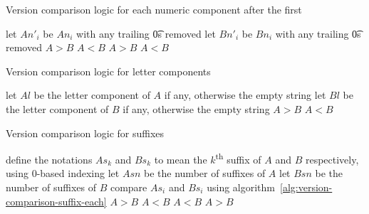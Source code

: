 \begin{algorithm}[p]
\caption{Version comparison logic for each numeric component after the first}
\label{alg:version-comparison-numeric-nonfirst}
\begin{algorithmic}[1]
    \STATE let $An'_i$ be $An_i$ with any trailing \t{0}s removed
    \STATE let $Bn'_i$ be $Bn_i$ with any trailing \t{0}s removed
      \RETURN $A>B$
      \RETURN $A<B$
    \ENDIF
  \ELSE
      \RETURN $A>B$
      \RETURN $A<B$
    \ENDIF
  \ENDIF
\end{algorithmic}
\end{algorithm}

\begin{algorithm}[p]
\caption{Version comparison logic for letter components} \label{alg:version-comparison-letter}
\begin{algorithmic}[1]
  \STATE let $Al$ be the letter component of $A$ if any, otherwise the empty string
  \STATE let $Bl$ be the letter component of $B$ if any, otherwise the empty string
    \RETURN $A>B$
    \RETURN $A<B$
  \ENDIF
\end{algorithmic}
\end{algorithm}

\begin{algorithm}[p]
\caption{Version comparison logic for suffixes} \label{alg:version-comparison-suffix}
\begin{algorithmic}[1]
  \STATE define the notations $As_k$ and $Bs_k$ to mean the $k$\textsuperscript{th} suffix of $A$
      and $B$ respectively, using $0$-based indexing
  \STATE let $Asn$ be the number of suffixes of $A$
  \STATE let $Bsn$ be the number of suffixes of $B$
    \STATE compare $As_i$ and $Bs_i$ using algorithm~\ref{alg:version-comparison-suffix-each}
  \ENDFOR
      \RETURN $A>B$
    \ELSE
      \RETURN $A<B$
    \ENDIF
      \RETURN $A<B$
    \ELSE
      \RETURN $A>B$
    \ENDIF
  \ENDIF
\end{algorithmic}
\end{algorithm}

